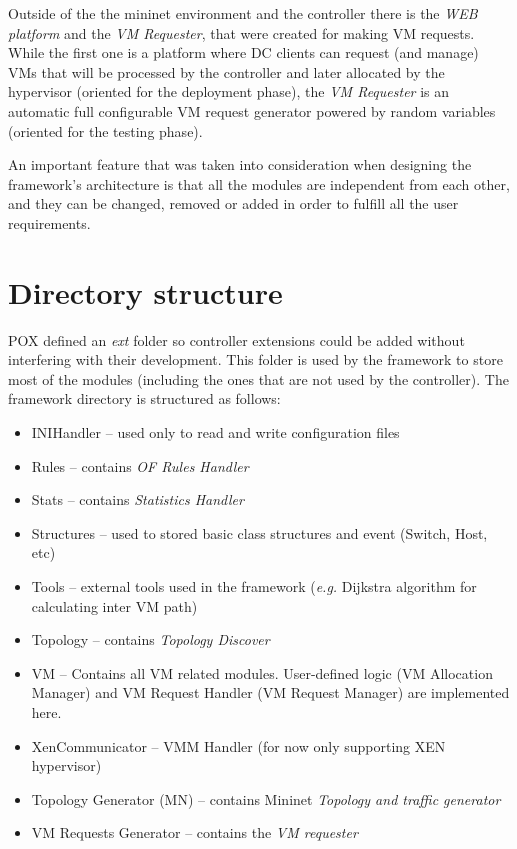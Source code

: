 \documentclass[12pt,english,oneside]{book}
\begin{document}
Outside of the the mininet environment and the controller there is the {\it WEB platform} and the {\it VM Requester}, that were created for making VM requests. While the first one is a platform where DC clients can request (and manage) VMs that will be processed by the controller and later allocated by the hypervisor (oriented for the deployment phase), the {\it VM Requester} is an automatic full configurable VM request generator powered by random variables (oriented for the testing phase).

An important feature that was taken into consideration when designing the framework's architecture is that all the modules are independent from each other, and they can be changed, removed or added in order to fulfill all the user requirements.

\newpage
\section{Directory structure}
\hspace{0.6cm}

POX defined an \textit{ext} folder so controller extensions could be added without interfering with their development. This folder is used by the framework to store most of the modules (including the ones that are not used by the controller).
The framework directory is structured as follows:

\begin{itemize}
  \item INIHandler -- used only to read and write configuration files
  \item Rules -- contains \textit{OF Rules Handler}
  \item Stats -- contains \textit{Statistics Handler}
  \item Structures -- used to stored basic class structures and event (Switch, Host, etc)
  \item Tools -- external tools used in the framework (\textit{e.g.} Dijkstra algorithm for calculating inter VM path)
  \item Topology -- contains \textit{Topology Discover}
  \item VM -- Contains all VM related modules. User-defined logic (VM Allocation Manager) and VM Request Handler (VM Request Manager) are implemented here.
  \item XenCommunicator -- VMM Handler (for now only supporting XEN hypervisor)
  \item Topology Generator (MN) -- contains Mininet \textit{Topology and traffic generator}
  \item VM Requests Generator -- contains the \textit{VM requester}
\end{itemize}
\end{document}
